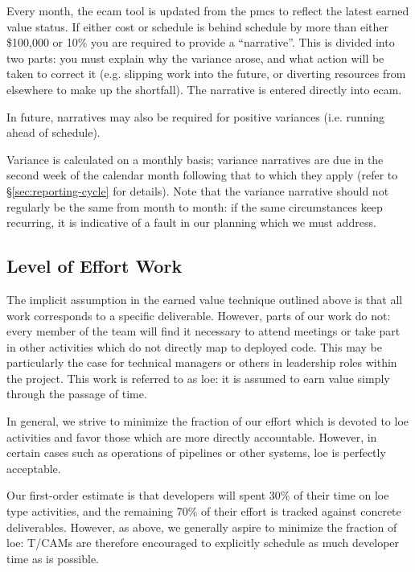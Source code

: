 Every month, the \gls{ecam} tool is updated from the \gls{pmcs} to reflect the latest earned value status.
If either cost or schedule is behind schedule by more than either \$100,000 or 10\% you are required to provide a ``narrative''.
This is divided into two parts: you must explain why the variance arose, and what action will be taken to correct it (e.g.  slipping work into the future, or diverting resources from elsewhere to make up the shortfall).
The narrative is entered directly into \gls{ecam}.

In future, narratives may also be required for positive variances (i.e. running ahead of schedule).

Variance is calculated on a monthly basis; variance narratives are due in the second week of the calendar month following that to which they apply (refer to \S\ref{sec:reporting-cycle} for details).
Note that the variance narrative should not regularly be the same from month to month: if the same circumstances keep recurring, it is indicative of a fault in our planning which we must address.

\subsection{Level of Effort Work}
\label{sec:loe}

The implicit assumption in the earned value technique outlined above is that all work corresponds to a specific deliverable.
However, parts of our work do not: every member of the team will find it necessary to attend meetings or take part in other activities which do not directly map to deployed code.
This may be particularly the case for technical managers or others in leadership roles within the project.
This work is referred to as \gls{loe}: it is assumed to earn value simply through the passage of time.

In general, we strive to minimize the fraction of our effort which is devoted to \gls{loe} activities and favor those which are more directly accountable.
However, in certain cases such as operations of pipelines or other systems, \gls{loe} is perfectly acceptable.

Our first-order estimate is that developers will spent 30\% of their time on \gls{loe} type activities, and the remaining 70\% of their effort is tracked against concrete deliverables.
However, as above, we generally aspire to minimize the fraction of \gls{loe}: T/CAMs are therefore encouraged to explicitly schedule as much developer time as is possible.


